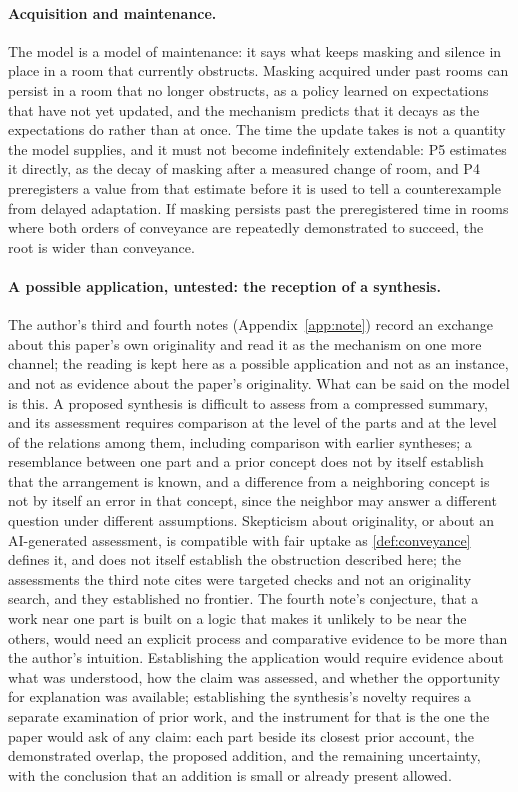 \paragraph{Acquisition and maintenance.} The model is a model of maintenance: it says what keeps masking and silence in place in a room that currently obstructs. Masking acquired under past rooms can persist in a room that no longer obstructs, as a policy learned on expectations that have not yet updated, and the mechanism predicts that it decays as the expectations do rather than at once. The time the update takes is not a quantity the model supplies, and it must not become indefinitely extendable: P5 estimates it directly, as the decay of masking after a measured change of room, and P4 preregisters a value from that estimate before it is used to tell a counterexample from delayed adaptation. If masking persists past the preregistered time in rooms where both orders of conveyance are repeatedly demonstrated to succeed, the root is wider than conveyance.

\paragraph{A possible application, untested: the reception of a synthesis.} The author's third and fourth notes (Appendix~\ref{app:note}) record an exchange about this paper's own originality and read it as the mechanism on one more channel; the reading is kept here as a possible application and not as an instance, and not as evidence about the paper's originality. What can be said on the model is this. A proposed synthesis is difficult to assess from a compressed summary, and its assessment requires comparison at the level of the parts and at the level of the relations among them, including comparison with earlier syntheses; a resemblance between one part and a prior concept does not by itself establish that the arrangement is known, and a difference from a neighboring concept is not by itself an error in that concept, since the neighbor may answer a different question under different assumptions. Skepticism about originality, or about an AI-generated assessment, is compatible with fair uptake as \autoref{def:conveyance} defines it, and does not itself establish the obstruction described here; the assessments the third note cites were targeted checks and not an originality search, and they established no frontier. The fourth note's conjecture, that a work near one part is built on a logic that makes it unlikely to be near the others, would need an explicit process and comparative evidence to be more than the author's intuition. Establishing the application would require evidence about what was understood, how the claim was assessed, and whether the opportunity for explanation was available; establishing the synthesis's novelty requires a separate examination of prior work, and the instrument for that is the one the paper would ask of any claim: each part beside its closest prior account, the demonstrated overlap, the proposed addition, and the remaining uncertainty, with the conclusion that an addition is small or already present allowed.

